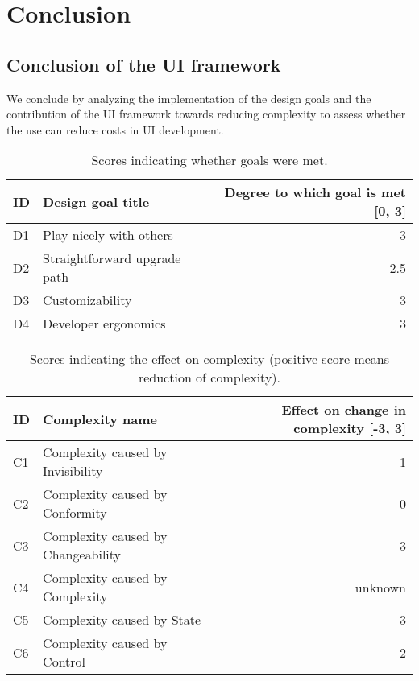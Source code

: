 \section{Conclusion}\label{conclusion}

\subsection{Conclusion of the UI framework}
We conclude by analyzing the implementation of the design goals and the contribution of the UI framework towards reducing complexity to assess whether the use can reduce costs in UI development.

\begin{table}[]
  \begin{center}
    \begin{tabular}{|l|l|r|}
      \hline
      \textbf{ID} & \textbf{Design goal title} & \textbf{Degree to which goal is met [0, 3]} \\
      \hline
      D1 & Play nicely with others & 3 \\
      \hline
      D2 & Straightforward upgrade path & 2.5 \\
      \hline
      D3 & Customizability & 3 \\
      \hline
      D4 & Developer ergonomics & 3 \\
      \hline
    \end{tabular}
    \caption{Scores indicating whether goals were met.}
  \end{center}
\end{table}

\begin{table}[]
  \begin{center}
    \begin{tabular}{|l|l|r|}
      \hline
      \textbf{ID} & \textbf{Complexity name} & \textbf{Effect on change in complexity [-3, 3]} \\
      \hline
      C1 & Complexity caused by Invisibility & 1 \\
      \hline
      C2 & Complexity caused by Conformity & 0 \\
      \hline
      C3 & Complexity caused by Changeability & 3 \\
      \hline
      C4 & Complexity caused by Complexity & unknown \\
      \hline
      C5 & Complexity caused by State & 3 \\
      \hline
      C6 & Complexity caused by Control & 2 \\
      \hline
    \end{tabular}
    \caption{Scores indicating the effect on complexity (positive score means reduction of complexity).}
    \label{tab:summarycomplexity}
  \end{center}
\end{table}

